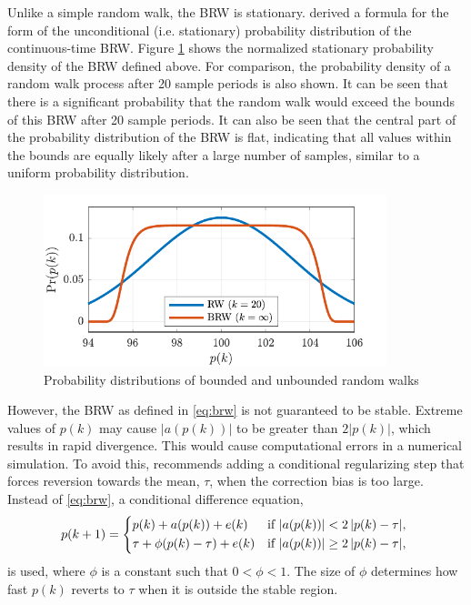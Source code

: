 {Unlike a simple random walk, the \gls{BRW} is stationary. \cite{nicolau_stationary_2002} derived a formula for the form of the unconditional (i.e. stationary) probability distribution of the continuous-time \gls{BRW}. Figure \ref{fig:brw-pdf} shows the normalized stationary probability density of the \gls{BRW} defined above. For comparison, the probability density of a random walk process after 20 sample periods is also shown. It can be seen that there is a significant probability that the random walk would exceed the bounds of this \gls{BRW} after 20 sample periods. It can also be seen that the central part of the probability distribution of the \gls{BRW} is flat, indicating that all values within the bounds are equally likely after a large number of samples, similar to a uniform probability distribution.


\begin{figure}[ht]
	\centering
	\includegraphics[height=5cm]{images/brw_pdf.pdf}
	\caption{Probability distributions of bounded and unbounded random walks}
	\label{fig:brw-pdf}
\end{figure}

However, the \gls{BRW} as defined in \eqref{eq:brw} is not guaranteed to be stable. Extreme values of $p(k)$ may cause $|a(p(k))|$ to be greater than $2|p(k)|$, which results in rapid divergence. This would cause computational errors in a numerical simulation. To avoid this, \cite{nicolau_stationary_2002} recommends adding a conditional regularizing step that forces reversion towards the mean, $\tau$, when the correction bias is too large. Instead of \eqref{eq:brw}, a conditional difference equation,
\begin{equation} \label{eq:brw-reg}
	p(k+1) = \begin{cases*}
		p(k) + a(p(k)) + e(k) & if $\left|a(p(k)) \right| < 2\left| p(k) - \tau \right|$, \\
		\tau + \phi(p(k) - \tau) + e(k) & if $\left|a(p(k)) \right| \geq 2\left| p(k) - \tau \right|$,
	\end{cases*}
\end{equation}
is used, where $\phi$ is a constant such that $0<\phi<1$. The size of $\phi$ determines how fast $p(k)$ reverts to $\tau$ when it is outside the stable region.

}
